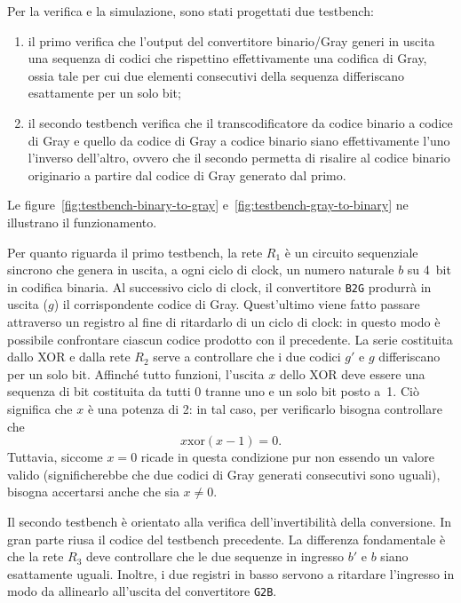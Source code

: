 \documentclass[a4paper,11pt,twoside]{article}
\begin{document}
Per la verifica e la simulazione, sono stati progettati due testbench:
\begin{enumerate}
\item il primo verifica che l'output del convertitore binario/Gray generi in uscita una sequenza di codici che rispettino effettivamente una codifica di Gray, ossia tale per cui due elementi consecutivi della sequenza differiscano esattamente per un solo bit;
\item il secondo testbench verifica che il transcodificatore da codice binario a codice di Gray e quello da codice di Gray a codice binario siano effettivamente l'uno l'inverso dell'altro, ovvero che il secondo permetta di risalire al codice binario originario a partire dal codice di Gray generato dal primo.
\end{enumerate}

Le figure~\ref{fig:testbench-binary-to-gray} e~\ref{fig:testbench-gray-to-binary} ne illustrano il funzionamento.

Per quanto riguarda il primo testbench, la rete $R_1$ è un circuito sequenziale sincrono che genera in uscita, a ogni ciclo di clock, un numero naturale $b$ su 4~bit in codifica binaria. Al successivo ciclo di clock, il convertitore \texttt{B2G} produrrà in uscita ($g$) il corrispondente codice di Gray. Quest'ultimo viene fatto passare attraverso un registro al fine di ritardarlo di un ciclo di clock: in questo modo è possibile confrontare ciascun codice prodotto con il precedente. La serie costituita dallo XOR e dalla rete $R_2$ serve a controllare che i due codici $g'$ e $g$ differiscano per un solo bit. Affinché tutto funzioni, l'uscita $x$ dello XOR deve essere una sequenza di bit costituita da tutti 0 tranne uno e un solo bit posto a~1. Ciò significa che $x$ è una potenza di 2: in tal caso, per verificarlo bisogna controllare che
\[
  x \mathbin{\mathrm{xor}} (x-1) = 0.
\]
Tuttavia, siccome $x=0$ ricade in questa condizione pur non essendo un valore valido (significherebbe che due codici di Gray generati consecutivi sono uguali), bisogna accertarsi anche che sia $x\neq0$.

Il secondo testbench è orientato alla verifica dell'invertibilità della conversione. In gran parte riusa il codice del testbench precedente. La differenza fondamentale è che la rete $R_3$ deve controllare che le due sequenze in ingresso $b'$ e $b$ siano esattamente uguali. Inoltre, i due registri in basso servono a ritardare l'ingresso in modo da allinearlo all'uscita del convertitore \texttt{G2B}.
\end{document}
